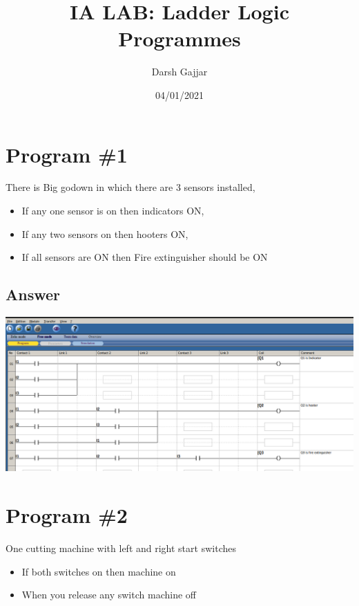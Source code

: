 \documentclass[
	12pt, %
]{fphw}
\title{IA LAB: Ladder Logic Programmes} %
\author{Darsh Gajjar} %
\date{04/01/2021}
\institute{SVNIT, SURAT \\ M. Tech. I \& C (Electrical Department)} %
\begin{document}
\maketitle %
\pagebreak

\section*{Program \#1}

\begin{problem}
  There is Big godown in which there are 3 sensors installed,
  \medskip
  \begin{itemize} 
   \item If any one sensor is on then indicators ON,
   \item If any two sensors on then hooters ON,
   \item If all sensors are ON then Fire extinguisher should be ON
  \end{itemize}
\end{problem}
\subsection*{Answer}
 \begin{center}
 \includegraphics[width=165mm, scale=0.80]{prg1.png} %
\end{center}
\section*{Program \#2}
\begin{problem}
One cutting machine with left and right start switches
\medskip
 \begin{itemize}%
  \item If both switches on then machine on
  \item When you release any switch machine off
  \end{itemize}
\end{problem}
\end{document}
